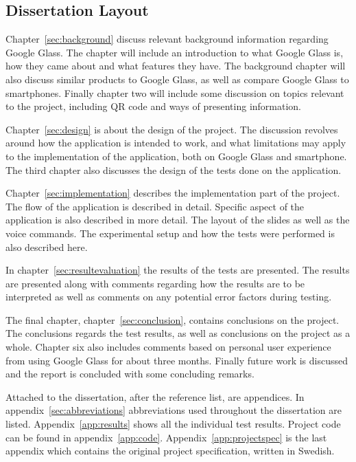 \subsection{Dissertation Layout}
Chapter~\ref{sec:background} discuss relevant background information regarding Google Glass. The chapter will include an introduction to what Google Glass is, how they came about and what features they have. The background chapter will also discuss similar products to Google Glass, as well as compare Google Glass to smartphones. Finally chapter two will include some discussion on topics relevant to the project, including QR code and ways of presenting information.

Chapter~\ref{sec:design} is about the design of the project. The discussion revolves around how the application is intended to work, and what limitations may apply to the implementation of the application, both on Google Glass and smartphone. The third chapter also discusses the design of the tests done on the application.

Chapter~\ref{sec:implementation} describes the implementation part of the project. The flow of the application is described in detail. Specific aspect of the application is also described in more detail. The layout of the slides as well as the voice commands. The experimental setup and how the tests were performed is also described here.

In chapter~\ref{sec:resultevaluation} the results of the tests are presented. The results are presented along with comments regarding how the results are to be interpreted as well as comments on any potential error factors during testing.

The final chapter, chapter~\ref{sec:conclusion}, contains conclusions on the project. The conclusions regards the test results, as well as conclusions on the project as a whole. Chapter six also includes comments based on personal user experience from using Google Glass for about three months. Finally future work is discussed and the report is concluded with some concluding remarks.

Attached to the dissertation, after the reference list, are appendices. In appendix~\ref{sec:abbreviations} abbreviations used throughout the dissertation are listed. Appendix~\ref{app:results} shows all the individual test results. Project code can be found in appendix~\ref{app:code}. Appendix~\ref{app:projectspec} is the last appendix which contains the original project specification, written in Swedish.